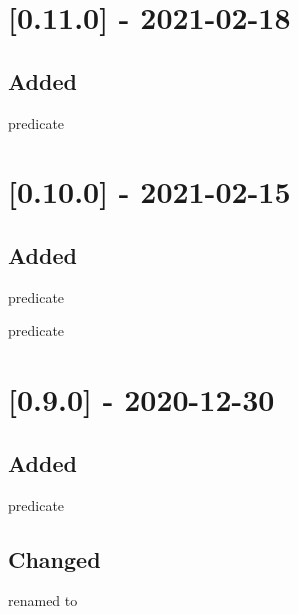 \section{[0.11.0] - 2021-02-18}

\subsection{Added}

\begin{shortlist}
    \item {} predicate
\end{shortlist}

\section{[0.10.0] - 2021-02-15}

\subsection{Added}

\begin{shortlist}
    \item {} predicate
    \item {} predicate
\end{shortlist}

\section{[0.9.0] - 2020-12-30}

\subsection{Added}

\begin{shortlist}
    \item {} predicate
\end{shortlist}

\subsection{Changed}

\begin{shortlist}
    \item {} renamed to 
\end{shortlist}

